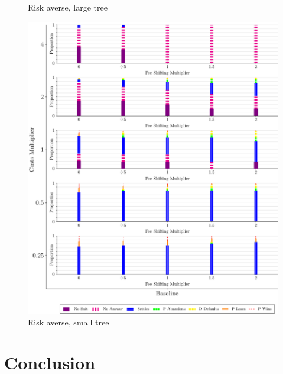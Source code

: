 \documentclass{article}
\begin{document}
\begin{figure}
\begin{minipage}{0.24\textwidth}
		\caption{Risk averse, large tree}
		\label{fig:treesize_panel3}
    \end{minipage}\hfill
    \begin{minipage}{0.24\textwidth}
        \centering
		\includegraphics[scale=0.15, trim={0in 0in 0in 0in}, clip]{../Figures/Disposition (Risk Averse) Baseline (Small Tree).pdf}
		\caption{Risk averse, small tree}
		\label{fig:treesize_panel4}
    \end{minipage}
\end{figure}

\section{Conclusion}
\end{document}
